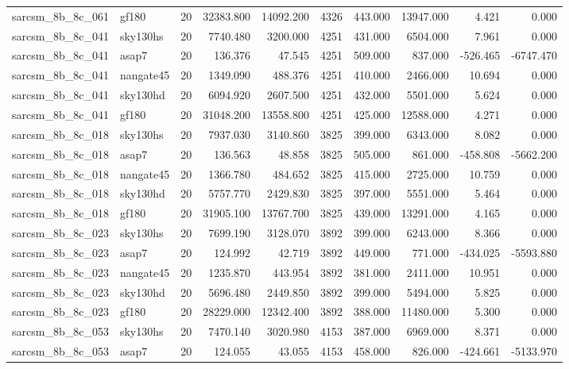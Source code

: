 \begin{tabular}{llrrrrrrrr}
sarcsm\_8b\_8c\_061 & gf180 & 20 & 32383.800 & 14092.200 & 4326 & 443.000 & 13947.000 & 4.421 & 0.000 \\
sarcsm\_8b\_8c\_041 & sky130hs & 20 & 7740.480 & 3200.000 & 4251 & 431.000 & 6504.000 & 7.961 & 0.000 \\
sarcsm\_8b\_8c\_041 & asap7 & 20 & 136.376 & 47.545 & 4251 & 509.000 & 837.000 & -526.465 & -6747.470 \\
sarcsm\_8b\_8c\_041 & nangate45 & 20 & 1349.090 & 488.376 & 4251 & 410.000 & 2466.000 & 10.694 & 0.000 \\
sarcsm\_8b\_8c\_041 & sky130hd & 20 & 6094.920 & 2607.500 & 4251 & 432.000 & 5501.000 & 5.624 & 0.000 \\
sarcsm\_8b\_8c\_041 & gf180 & 20 & 31048.200 & 13558.800 & 4251 & 425.000 & 12588.000 & 4.271 & 0.000 \\
sarcsm\_8b\_8c\_018 & sky130hs & 20 & 7937.030 & 3140.860 & 3825 & 399.000 & 6343.000 & 8.082 & 0.000 \\
sarcsm\_8b\_8c\_018 & asap7 & 20 & 136.563 & 48.858 & 3825 & 505.000 & 861.000 & -458.808 & -5662.200 \\
sarcsm\_8b\_8c\_018 & nangate45 & 20 & 1366.780 & 484.652 & 3825 & 415.000 & 2725.000 & 10.759 & 0.000 \\
sarcsm\_8b\_8c\_018 & sky130hd & 20 & 5757.770 & 2429.830 & 3825 & 397.000 & 5551.000 & 5.464 & 0.000 \\
sarcsm\_8b\_8c\_018 & gf180 & 20 & 31905.100 & 13767.700 & 3825 & 439.000 & 13291.000 & 4.165 & 0.000 \\
sarcsm\_8b\_8c\_023 & sky130hs & 20 & 7699.190 & 3128.070 & 3892 & 399.000 & 6243.000 & 8.366 & 0.000 \\
sarcsm\_8b\_8c\_023 & asap7 & 20 & 124.992 & 42.719 & 3892 & 449.000 & 771.000 & -434.025 & -5593.880 \\
sarcsm\_8b\_8c\_023 & nangate45 & 20 & 1235.870 & 443.954 & 3892 & 381.000 & 2411.000 & 10.951 & 0.000 \\
sarcsm\_8b\_8c\_023 & sky130hd & 20 & 5696.480 & 2449.850 & 3892 & 399.000 & 5494.000 & 5.825 & 0.000 \\
sarcsm\_8b\_8c\_023 & gf180 & 20 & 28229.000 & 12342.400 & 3892 & 388.000 & 11480.000 & 5.300 & 0.000 \\
sarcsm\_8b\_8c\_053 & sky130hs & 20 & 7470.140 & 3020.980 & 4153 & 387.000 & 6969.000 & 8.371 & 0.000 \\
sarcsm\_8b\_8c\_053 & asap7 & 20 & 124.055 & 43.055 & 4153 & 458.000 & 826.000 & -424.661 & -5133.970 \\

\end{tabular}
